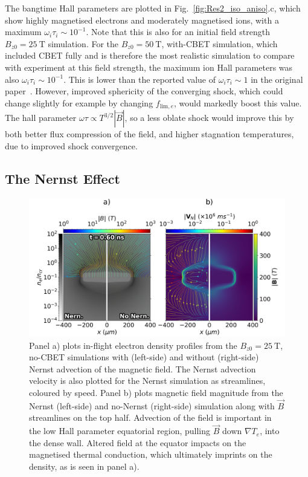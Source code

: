 The bangtime Hall parameters are plotted in Fig.~\ref{fig:Res2_iso_aniso}.c, which show highly magnetised electrons and moderately magnetised ions, with a maximum $\omega_i\tau_i\sim10^{-1}$.
Note that this is also for an initial field strength $B_{z0}=25\ \text{T}$ simulation.
For the $B_{z0}=50\ \text{T}$, with-\ac{CBET} simulation, which included \ac{CBET} fully and is therefore the most realistic simulation to compare with experiment at this field strength, the maximum ion Hall parameters was also $\omega_i\tau_i\sim10^{-1}$.
This is lower than the reported value of $\omega_i\tau_i\sim1$ in the original paper~\cite{bose_effect_2022}.
However, improved sphericity of the converging shock, which could change slightly for example by changing $f_{\text{lim},e}$, would markedly boost this value.
The hall parameter $\omega\tau\propto T^{3/2}|\vec{B}|$, so a less oblate shock would improve this by both better flux compression of the field, and higher stagnation temperatures, due to improved shock convergence.

\subsection{The Nernst Effect}%
\label{sec:Res2_nernst}

\begin{figure}[t!]
    \includegraphics[width=\linewidth]{Results2/Images/nernst_comp_Bstream.png}
    \centering
    \caption{Panel a) plots in-flight electron density profiles from the $B_{z0}=25\ \text{T}$, no-\ac{CBET} simulations with (left-side) and without (right-side) Nernst advection of the magnetic field.
    The Nernst advection velocity is also plotted for the Nernst simulation as streamlines, coloured by speed.
    Panel b) plots magnetic field magnitude from the Nernst (left-side) and no-Nernst (right-side) simulation along with $\vec{B}$ streamlines on the top half.
    Advection of the field is important in the low Hall parameter equatorial region, pulling $\vec{B}$ down $\nabla T_e$, into the dense wall.
    Altered field at the equator impacts on the magnetised thermal conduction, which ultimately imprints on the density, as is seen in panel a).}%
    \label{fig:Res2_nernst_comp}
\end{figure}


